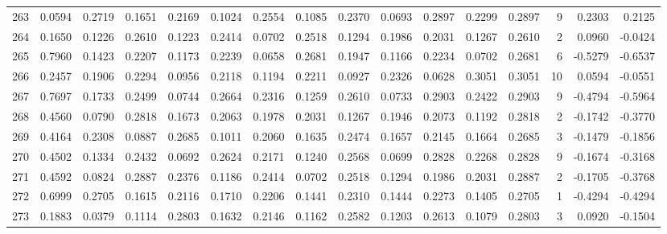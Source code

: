 \begin{tabular}{lrrrrrrrrrrrrrrr}
263 &      0.0594 &  0.2719 &  0.1651 &  0.2169 &  0.1024 &  0.2554 &  0.1085 &  0.2370 &  0.0693 &  0.2897 &   0.2299 &     0.2897 &      9 &                    0.2303 &                     0.2125 \\
264 &      0.1650 &  0.1226 &  0.2610 &  0.1223 &  0.2414 &  0.0702 &  0.2518 &  0.1294 &  0.1986 &  0.2031 &   0.1267 &     0.2610 &      2 &                    0.0960 &                    -0.0424 \\
265 &      0.7960 &  0.1423 &  0.2207 &  0.1173 &  0.2239 &  0.0658 &  0.2681 &  0.1947 &  0.1166 &  0.2234 &   0.0702 &     0.2681 &      6 &                   -0.5279 &                    -0.6537 \\
266 &      0.2457 &  0.1906 &  0.2294 &  0.0956 &  0.2118 &  0.1194 &  0.2211 &  0.0927 &  0.2326 &  0.0628 &   0.3051 &     0.3051 &     10 &                    0.0594 &                    -0.0551 \\
267 &      0.7697 &  0.1733 &  0.2499 &  0.0744 &  0.2664 &  0.2316 &  0.1259 &  0.2610 &  0.0733 &  0.2903 &   0.2422 &     0.2903 &      9 &                   -0.4794 &                    -0.5964 \\
268 &      0.4560 &  0.0790 &  0.2818 &  0.1673 &  0.2063 &  0.1978 &  0.2031 &  0.1267 &  0.1946 &  0.2073 &   0.1192 &     0.2818 &      2 &                   -0.1742 &                    -0.3770 \\
269 &      0.4164 &  0.2308 &  0.0887 &  0.2685 &  0.1011 &  0.2060 &  0.1635 &  0.2474 &  0.1657 &  0.2145 &   0.1664 &     0.2685 &      3 &                   -0.1479 &                    -0.1856 \\
270 &      0.4502 &  0.1334 &  0.2432 &  0.0692 &  0.2624 &  0.2171 &  0.1240 &  0.2568 &  0.0699 &  0.2828 &   0.2268 &     0.2828 &      9 &                   -0.1674 &                    -0.3168 \\
271 &      0.4592 &  0.0824 &  0.2887 &  0.2376 &  0.1186 &  0.2414 &  0.0702 &  0.2518 &  0.1294 &  0.1986 &   0.2031 &     0.2887 &      2 &                   -0.1705 &                    -0.3768 \\
272 &      0.6999 &  0.2705 &  0.1615 &  0.2116 &  0.1710 &  0.2206 &  0.1441 &  0.2310 &  0.1444 &  0.2273 &   0.1405 &     0.2705 &      1 &                   -0.4294 &                    -0.4294 \\
273 &      0.1883 &  0.0379 &  0.1114 &  0.2803 &  0.1632 &  0.2146 &  0.1162 &  0.2582 &  0.1203 &  0.2613 &   0.1079 &     0.2803 &      3 &                    0.0920 &                    -0.1504 \\

\end{tabular}
